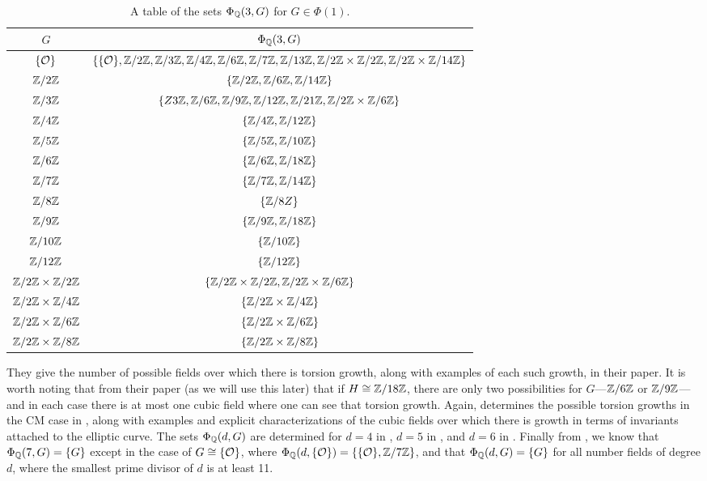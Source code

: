 	\begin{table}[!ht]
	\centering
	\caption{A table of the sets $\Phi_{\mathbb{Q}}(3,G)$ for $G \in \Phi(1)$.\label{tab:torsiongrowthcubic}}
	\begin{tabular}{|c|c|} \hline
	$G$ & $\Phi_{\mathbb{Q}}(3,G)$ \\ \hline
	$\{\mathcal{O}\}$ & $\{ \{\mathcal{O}\}, \mathbb{Z}/2\mathbb{Z}, \mathbb{Z}/3\mathbb{Z}, \mathbb{Z}/4\mathbb{Z}, \mathbb{Z}/6\mathbb{Z}, \mathbb{Z}/7\mathbb{Z}, \mathbb{Z}/13\mathbb{Z}, \mathbb{Z}/2\mathbb{Z} \times \mathbb{Z}/2\mathbb{Z}, \mathbb{Z}/2\mathbb{Z} \times \mathbb{Z}/14\mathbb{Z} \}$ \\ \hline
	$\mathbb{Z}/2\mathbb{Z}$ & $\{ \mathbb{Z}/2\mathbb{Z}, \mathbb{Z}/6\mathbb{Z}, \mathbb{Z}/14\mathbb{Z} \}$ \\ \hline
	$\mathbb{Z}/3\mathbb{Z}$ & $\{ Z\/3\mathbb{Z}, \mathbb{Z}/6\mathbb{Z}, \mathbb{Z}/9\mathbb{Z}, \mathbb{Z}/12\mathbb{Z}, \mathbb{Z}/21\mathbb{Z}, \mathbb{Z}/2\mathbb{Z} \times \mathbb{Z}/6\mathbb{Z} \}$ \\ \hline
	$\mathbb{Z}/4\mathbb{Z}$ & $\{ \mathbb{Z}/4\mathbb{Z}, \mathbb{Z}/12\mathbb{Z} \}$ \\ \hline
	$\mathbb{Z}/5\mathbb{Z}$ & $\{ \mathbb{Z}/5\mathbb{Z}, \mathbb{Z}/10\mathbb{Z} \}$ \\ \hline
	$\mathbb{Z}/6\mathbb{Z}$ & $\{ \mathbb{Z}/6\mathbb{Z}, \mathbb{Z}/18\mathbb{Z} \}$ \\ \hline
	$\mathbb{Z}/7\mathbb{Z}$ & $\{ \mathbb{Z}/7\mathbb{Z}, \mathbb{Z}/14\mathbb{Z} \}$ \\ \hline
	$\mathbb{Z}/8\mathbb{Z}$ & $\{ \mathbb{Z}/8Z \}$ \\ \hline
	$\mathbb{Z}/9\mathbb{Z}$ & $\{ \mathbb{Z}/9\mathbb{Z}, \mathbb{Z}/18\mathbb{Z} \}$ \\ \hline
	$\mathbb{Z}/10\mathbb{Z}$ & $\{ \mathbb{Z}/10\mathbb{Z} \}$ \\ \hline
	$\mathbb{Z}/12\mathbb{Z}$ & $\{ \mathbb{Z}/12\mathbb{Z} \}$ \\ \hline
	$\mathbb{Z}/2\mathbb{Z} \times \mathbb{Z}/2\mathbb{Z}$ & $\{ \mathbb{Z}/2\mathbb{Z} \times \mathbb{Z}/2\mathbb{Z}, \mathbb{Z}/2\mathbb{Z} \times \mathbb{Z}/6\mathbb{Z} \}$ \\ \hline
	$\mathbb{Z}/2\mathbb{Z} \times \mathbb{Z}/4\mathbb{Z}$ & $\{ \mathbb{Z}/2\mathbb{Z} \times \mathbb{Z}/4\mathbb{Z} \}$ \\ \hline
	$\mathbb{Z}/2\mathbb{Z} \times \mathbb{Z}/6\mathbb{Z}$ & $\{ \mathbb{Z}/2\mathbb{Z} \times \mathbb{Z}/6\mathbb{Z} \}$ \\ \hline
	$\mathbb{Z}/2\mathbb{Z} \times \mathbb{Z}/8\mathbb{Z}$ & $\{ \mathbb{Z}/2\mathbb{Z} \times \mathbb{Z}/8\mathbb{Z} \}$ \\ \hline
	\end{tabular}
	\end{table}


They give the number of possible fields over which there is torsion growth, along with examples of each such growth, in their paper. It is worth noting that from their paper (as we will use this later) that if $H \cong \mathbb{Z}/18\mathbb{Z}$, there are only two possibilities for $G$---$\mathbb{Z}/6\mathbb{Z}$ or $\mathbb{Z}/9\mathbb{Z}$---and in each case there is at most one cubic field where one can see that torsion growth. Again, \gonjim{} determines the possible torsion growths in the CM case in \cite{gonzalezjimenezgrowth20}, along with examples and explicit characterizations of the cubic fields over which there is growth in terms of invariants attached to the elliptic curve. The sets $\Phi_{\mathbb{Q}}(d,G)$ are determined for $d= 4$ in \cite{gonzalezjimenezlozanorobledo18}, $d= 5$ in \cite{gonzalezjimenez17}, and $d= 6$ in \cite{danielsgonzalezjimenez20}. Finally from \cite{gonzalezjimeneznajman20base}, we know that $\Phi_{\mathbb{Q}}(7,G)= \{ G \}$ except in the case of $G \cong \{ \mathcal{O} \}$, where $\Phi_{\mathbb{Q}}(d, \{ \mathcal{O} \})= \{ \{ \mathcal{O} \}, \mathbb{Z}/7\mathbb{Z} \}$, and that $\Phi_{\mathbb{Q}}(d,G)= \{ G \}$ for all number fields of degree $d$, where the smallest prime divisor of $d$ is at least 11. 






